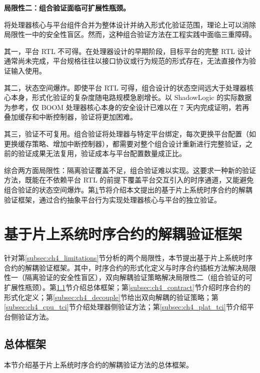 \textbf{局限性二：组合验证面临可扩展性瓶颈。}

将处理器核心与平台组件合并为整体设计并纳入形式化验证范围，理论上可以消除局限性一中的安全性盲区。然而，这种组合验证方法在工程实践中面临三重障碍。

其一，平台 RTL 不可得。在处理器设计的早期阶段，目标平台的完整 RTL 设计通常尚未完成，平台规格往往以接口协议或行为规范的形式存在，无法直接作为验证输入使用。

其二，状态空间爆炸。即使平台 RTL 可得，组合设计的状态空间远大于处理器核心本身，形式化验证的复杂度随电路规模急剧增长。以 ShadowLogic 的实际数据为参考，仅 BOOM 处理器核心本身的安全设计已难以在 7 天内完成证明，若再叠加缓存和中断控制器，验证将更加困难。

其三，验证不可复用。组合验证将处理器与特定平台绑定，每次更换平台配置（如更换缓存策略、增加中断控制器），都需要对整个组合设计重新进行完整验证，之前的验证成果无法复用，验证成本与平台配置数量成正比。

综合两方面局限性：隔离验证覆盖不足，组合验证难以实现。这要求一种新的验证方法，既能在不依赖平台 RTL 的前提下覆盖平台交互引入的时序通道，又能避免组合验证的状态空间爆炸。第\ref{sec:ch4_framework}节将介绍本文提出的基于片上系统时序合约的解耦验证框架，通过合约抽象平台行为实现处理器核心与平台的独立验证。


\section{基于片上系统时序合约的解耦验证框架}
\label{sec:ch4_framework}

针对第\ref{subsec:ch4_limitations}节分析的两个局限性，本节提出基于片上系统时序合约的解耦验证框架。其中，时序合约的形式化定义与时序合约插桩方法解决局限性一（隔离验证的安全性盲区），双向解耦验证策略解决局限性二（组合验证的可扩展性瓶颈）。第\ref{subsec:ch4_overview}节介绍总体框架；第\ref{subsec:ch4_contract}节介绍时序合约的形式化定义；第\ref{subsec:ch4_decouple}节给出双向解耦的验证策略；第\ref{subsec:ch4_cpu_tci}节介绍处理器侧验证方法；第\ref{subsec:ch4_plat_tci}节介绍平台侧验证方法。

\subsection{总体框架}
\label{subsec:ch4_overview}

本节介绍基于片上系统时序合约的解耦验证方法的总体框架。

